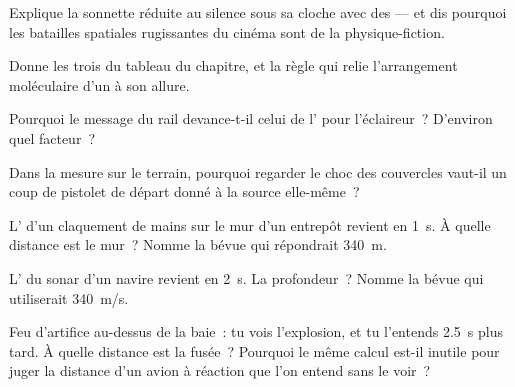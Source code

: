 \begin{exercise}[$\star$]\label{exo:g7:sound-production:3}
Explique la sonnette réduite au silence sous sa cloche avec des
 --- et dis pourquoi les batailles spatiales rugissantes du
cinéma sont de la physique-fiction.
\end{exercise}

\begin{exercise}[$\star$]\label{exo:g7:sound-production:4}
Donne les trois  du tableau du chapitre, et la règle qui
relie l'arrangement moléculaire d'un  à son allure.
\end{exercise}

\begin{exercise}[$\star$]\label{exo:g7:sound-production:5}
Pourquoi le message du rail devance-t-il celui de l' pour
l'éclaireur~? D'environ quel facteur~?
\end{exercise}

\begin{exercise}[$\star$]\label{exo:g7:sound-production:6}
Dans la mesure sur le terrain, pourquoi regarder le choc des
couvercles vaut-il un coup de pistolet de départ donné à la source
elle-même~?
\end{exercise}

\begin{exercise}[$\star$]\label{exo:g7:sound-production:7}
L' d'un claquement de mains sur le mur d'un entrepôt revient en
\qty{1}{s}. À quelle distance est le mur~? Nomme la bévue qui
répondrait \qty{340}{m}.
\end{exercise}

\begin{exercise}[$\star$]\label{exo:g7:sound-production:8}
L' du sonar d'un navire revient en \qty{2}{s}. La profondeur~?
Nomme la bévue qui utiliserait \qty{340}{m/s}.
\end{exercise}

\begin{exercise}[$\star\star$]\label{exo:g7:sound-production:9}
Feu d'artifice au-dessus de la baie~: tu vois l'explosion, et tu
l'entends \qty{2.5}{s} plus tard. À quelle distance est la fusée~?
Pourquoi le même calcul est-il inutile pour juger la distance d'un
avion à réaction que l'on entend sans le voir~?
\end{exercise}

